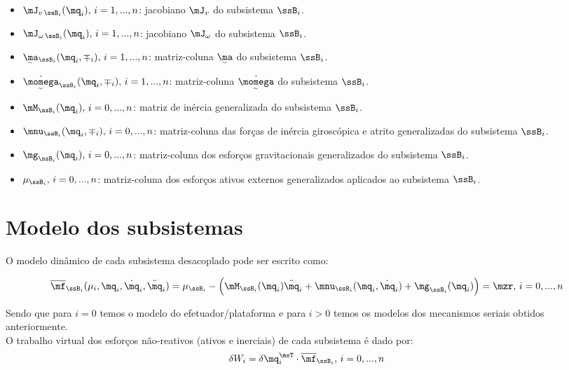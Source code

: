 \documentclass[]{politex}
\begin{document}
\begin{itemize}
\item $\mJ_{v\,\ssB_i}(\mq_i), \,i=1, ..., n$: jacobiano $\mJ_v$ do subsistema $\ssB_i$.
\item $\mJ_{\omega\,\ssB_i}(\mq_i), \,i=1, ..., n$: jacobiano $\mJ_\omega$ do subsistema $\ssB_i$.
\item $\underaccent{\sim}{\ma}_{\ssB_i}(\mq_i, \mp_i), \,i=1, ..., n$: matriz-coluna $\underaccent{\sim}{\ma}$ do subsistema $\ssB_i$.
\item $\underaccent{\sim}{\dot{\momega}}_{\ssB_i}(\mq_i, \mp_i), \,i=1, ..., n$: matriz-coluna $\underaccent{\sim}{\dot{\momega}}$ do subsistema $\ssB_i$.
\item $\mM_{\ssB_i}(\mq_i), \,i=0, ..., n$: matriz de in\'ercia generalizada do subsistema $\ssB_i$.
\item $\mnu_{\ssB_i}(\mq_i, \mp_i), \,i=0, ..., n$: matriz-coluna das forças de inércia girosc\'opica e atrito generalizadas do subsistema $\ssB_i$.
\item $\mg_{\ssB_i}(\mq_i), \,i=0, ..., n$: matriz-coluna dos esfor\c{c}os gravitacionais generalizados do subsistema $\ssB_i$.
\item $\mu_{\ssB_i}, \,i=0, ..., n$: matriz-coluna dos esfor\c{c}os ativos externos generalizados aplicados ao subsistema $\ssB_i$.
\end{itemize}

\section{Modelo dos subsistemas} \label{S05-03-01}

O modelo dinâmico de cada subsistema desacoplado pode ser escrito como:

\begin{equation} \label{eq:ModeloDosSubsistemas}
\overline{\mf}_{\ssB_i}(\mu_i, \mq_i, \dot{\mq}_i, \ddot{\mq}_i) =  \mu_{\ssB_i} - \Big(\mM_{\ssB_i}(\mq_i) \ddot{\mq}_i + \mnu_{\ssB_i}(\mq_i,\dot{\mq}_i) + \mg_{\ssB_i}(\mq_i)\Big) = \mzr, \, i = 0,...,n
\end{equation}

Sendo que para $i=0$ temos o modelo do efetuador/plataforma e para $i>0$ temos os modelos dos mecanismos seriais obtidos anteriormente. \\


O trabalho virtual dos esforços não-reativos (ativos e inerciais) de cada subsistema é dado por:
\begin{equation}
\delta W_i = \delta \mq_i^\msT \cdot \overline{\mf}_{\ssB_i}, \, i = 0,...,n
\end{equation}
\end{document}
